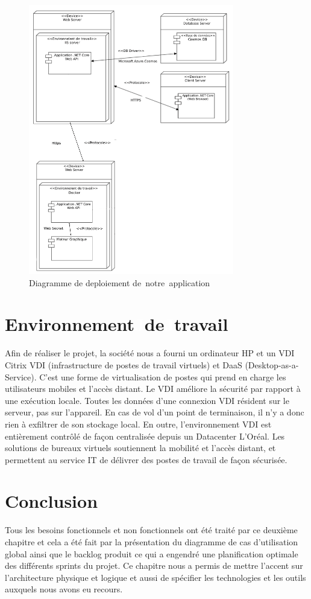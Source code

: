 \begin{figure}[!ht]
\centering
\includegraphics[width=0.8\textwidth,angle=00]{chapitres/chapitre2/figures/architecture physique.png}
\caption{Diagramme de deploiement de\textcolor{white}{J}notre\textcolor{white}{J}application}
\label{fig:physique}
\end{figure}


\section{Environnement\textcolor{white}{J}de\textcolor{white}{J}travail}
Afin de réaliser le projet, la société nous a fourni un ordinateur HP et un VDI Citrix VDI (infrastructure de postes de travail virtuels) et DaaS (Desktop-as-a-Service). C’est une forme de virtualisation de postes qui prend en charge les utilisateurs mobiles et l’accès distant.
Le VDI améliore la sécurité par rapport à une exécution locale. Toutes les données d’une connexion VDI résident sur le serveur, pas sur l’appareil. En cas de vol d’un point de terminaison, il n’y a donc rien à exfiltrer de son stockage local. En outre, l’environnement VDI est entièrement contrôlé de façon centralisée depuis un Datacenter L’Oréal.
Les solutions de bureaux virtuels soutiennent la mobilité et l’accès distant, et permettent au service IT de délivrer des postes de travail de façon sécurisée.

\section*{Conclusion}
Tous les besoins fonctionnels et non fonctionnels ont été traité par ce deuxième chapitre et cela a été fait par la présentation du diagramme de cas d’utilisation global ainsi que le backlog produit ce qui a engendré une planification optimale des différents sprints du projet. Ce chapitre nous a permis de mettre l’accent sur l’architecture physique et logique et aussi de spécifier les technologies et les outils auxquels nous avons eu recours.